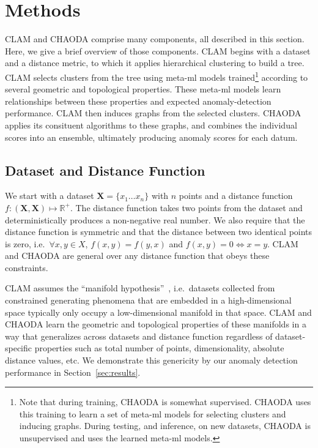 \section{Methods}
\label{sec:methods}

CLAM and CHAODA comprise many components, all described in this section.
Here, we give a brief overview of those components.
CLAM begins with a dataset and a distance metric, to which it applies hierarchical clustering to build a tree.
CLAM selects clusters from the tree using meta-ml models trained\footnote{Note that during training, CHAODA is somewhat supervised.
CHAODA uses this training to learn a set of meta-ml models for selecting clusters and inducing graphs.
During testing, and inference, on new datasets, CHAODA is unsupervised and uses the learned meta-ml models.} according to several geometric and topological properties.
These meta-ml models learn relationships between these properties and expected anomaly-detection performance.
CLAM then induces graphs from the selected clusters.
CHAODA applies its consituent algorithms to these graphs, and combines the individual scores into an ensemble, ultimately producing anomaly scores for each datum.


\subsection{Dataset and Distance Function}
\label{subsec:methods:dataset-and-distance-function}

We start with a dataset $\textbf{X} = \{x_1 \dots x_n\}$ with $n$ points and a distance function $f : (\textbf{X}, \textbf{X}) \mapsto \mathbb{R}^+$.
The distance function takes two points from the dataset and deterministically produces a non-negative real number.
We also require that the distance function is symmetric and that the distance between two identical points is zero, i.e.\ $\forall x, y \in X$, $f(x, y) = f(y, x)$ and $f(x, y) = 0 \Leftrightarrow x = y$.
CLAM and CHAODA are general over any distance function that obeys these constraints.

CLAM assumes the ``manifold hypothesis''~\cite{fefferman2016testing}, i.e.\ datasets collected from constrained generating phenomena that are embedded in a high-dimensional space typically only occupy a low-dimensional manifold in that space.
CLAM and CHAODA learn the geometric and topological properties of these manifolds in a way that generalizes across datasets and distance function regardless of dataset-specific properties such as total number of points, dimensionality, absolute distance values, etc.
We demonstrate this genericity by our anomaly detection performance in Section~\ref{sec:results}.

